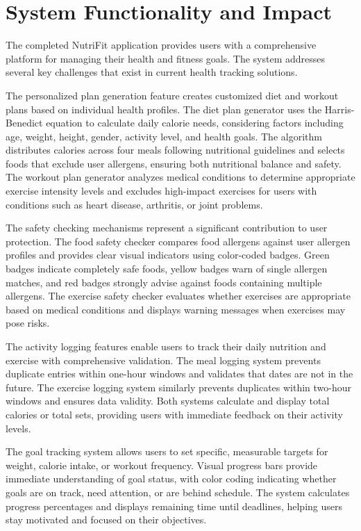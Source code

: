 \section{System Functionality and Impact}

The completed NutriFit application provides users with a comprehensive platform for managing their health and fitness goals. The system addresses several key challenges that exist in current health tracking solutions.

The personalized plan generation feature creates customized diet and workout plans based on individual health profiles. The diet plan generator uses the Harris-Benedict equation to calculate daily calorie needs, considering factors including age, weight, height, gender, activity level, and health goals. The algorithm distributes calories across four meals following nutritional guidelines and selects foods that exclude user allergens, ensuring both nutritional balance and safety. The workout plan generator analyzes medical conditions to determine appropriate exercise intensity levels and excludes high-impact exercises for users with conditions such as heart disease, arthritis, or joint problems.

The safety checking mechanisms represent a significant contribution to user protection. The food safety checker compares food allergens against user allergen profiles and provides clear visual indicators using color-coded badges. Green badges indicate completely safe foods, yellow badges warn of single allergen matches, and red badges strongly advise against foods containing multiple allergens. The exercise safety checker evaluates whether exercises are appropriate based on medical conditions and displays warning messages when exercises may pose risks.

The activity logging features enable users to track their daily nutrition and exercise with comprehensive validation. The meal logging system prevents duplicate entries within one-hour windows and validates that dates are not in the future. The exercise logging system similarly prevents duplicates within two-hour windows and ensures data validity. Both systems calculate and display total calories or total sets, providing users with immediate feedback on their activity levels.

The goal tracking system allows users to set specific, measurable targets for weight, calorie intake, or workout frequency. Visual progress bars provide immediate understanding of goal status, with color coding indicating whether goals are on track, need attention, or are behind schedule. The system calculates progress percentages and displays remaining time until deadlines, helping users stay motivated and focused on their objectives.

